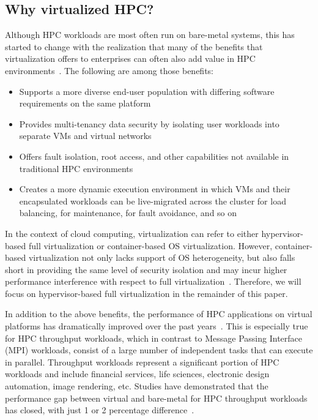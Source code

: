 \subsection{Why virtualized HPC?}
Although HPC workloads are most often run on bare-metal systems, this has started to change 
with the realization that many of the benefits that virtualization offers to enterprises 
can often also add value in HPC environments~\cite{mergen2006virtualization,nagarajan2007proactive,simons2010virtualizing}. The following are among those benefits:
\begin{itemize}
	\item Supports a more diverse end-user population with differing software requirements 
        on the same platform
	\item Provides multi-tenancy data security by isolating user workloads into separate VMs and virtual networks
	\item Offers fault isolation, root access, and other capabilities not available in traditional HPC environments
	\item Creates a more dynamic execution environment in which VMs and their encapsulated workloads 
	can be live-migrated across the cluster for load balancing, for maintenance, for fault avoidance, and so on
\end{itemize}

In the context of cloud computing, virtualization can refer to either hypervisor-based full virtualization or container-based OS virtualization. However, container-based virtualization not only lacks support of OS 
heterogeneity, but also falls short in providing the same level of security isolation 
and may incur higher performance interference with respect to full virtualization~\cite{reshetova2014security,sharma2016containers}. Therefore, we will focus on hypervisor-based full virtualization in the remainder of this paper. 

In addition to the above benefits, the performance of HPC applications on virtual platforms has dramatically 
improved over the past years~\cite{luszczek2011evaluation,younge2011analysis,morabito2015hypervisors}. This is especially true for HPC throughput workloads, which in contrast to Message Passing Interface (MPI) workloads, 
consist of a large number of independent tasks that can execute in parallel. Throughput workloads represent a 
significant portion of HPC workloads and include financial services, life sciences, electronic design automation, image rendering, etc. 
Studies have demonstrated that the performance gap between virtual and bare-metal for HPC throughput workloads has 
closed, with just 1 or 2 percentage difference~\cite{michael2018overcommit}. 

